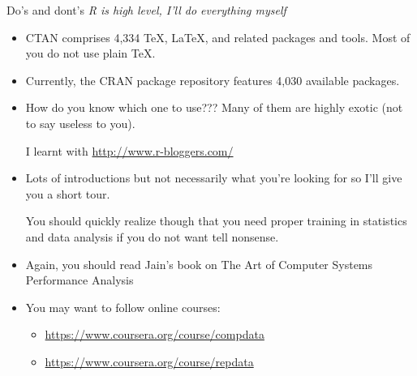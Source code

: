\documentclass[xcolor=x11names,compress,8pt]{beamer}
\renewcommand{\(}{\begin{columns}}
\renewcommand{\)}{\end{columns}}
\newcommand{\<}[1]{\begin{column}{#1}}
\renewcommand{\>}{\end{column}}
\begin{document}
\begin{frame}[label=sec-4-1-3]{Do's and dont's}
\textit{R is high level, I'll do everything myself}
\begin{itemize}
\item CTAN comprises 4,334 \TeX{}, \LaTeX{}, and related packages and
tools. Most of you do not use plain \TeX{}.
\item Currently, the CRAN package repository features 4,030 available
packages.
\item How do you know which one to use??? Many of them are highly
exotic (not to say useless to you).
\begin{center}
I learnt with \url{http://www.r-bloggers.com/}
\end{center}
\end{itemize}


\begin{itemize}
\item Lots of introductions but not necessarily what you're looking
for so \alert{I'll give you a short tour}. 

You should quickly realize though that you need proper training
in statistics and data analysis if you do not want tell
nonsense.

\item Again, you should read \alert{Jain's book on The Art of Computer Systems
Performance Analysis}

\item You may want to \alert{follow online courses}:
\begin{itemize}
\item \url{https://www.coursera.org/course/compdata}
\item \url{https://www.coursera.org/course/repdata}
\end{itemize}
\end{itemize}
\end{frame}
\end{document}

